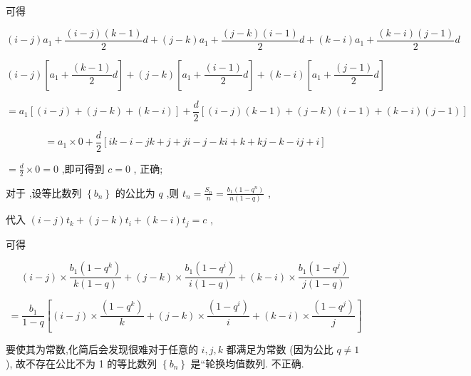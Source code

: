 \documentclass[10pt]{article}
\newcommand*\circled[1]{\tikz[baseline=(char.base)]{\node[shape=circle,draw,inner sep=1.5pt] (char) {\small #1};}}
\begin{document}
可得

\[
\left( {i - j}\right) {a}_{1} + \frac{\left( {i - j}\right) \left( {k - 1}\right) }{2}d + \left( {j - k}\right) {a}_{1} + \frac{\left( {j - k}\right) \left( {i - 1}\right) }{2}d + \left( {k - i}\right) {a}_{1} + \frac{\left( {k - i}\right) \left( {j - 1}\right) }{2}d
\]

\[
\left( {i - j}\right) \left\lbrack  {{a}_{1} + \frac{\left( k - 1\right) }{2}d}\right\rbrack   + \left( {j - k}\right) \left\lbrack  {{a}_{1} + \frac{\left( i - 1\right) }{2}d}\right\rbrack   + \left( {k - i}\right) \left\lbrack  {{a}_{1} + \frac{\left( j - 1\right) }{2}d}\right\rbrack
\]

\[
= {a}_{1}\left\lbrack  {\left( {i - j}\right)  + \left( {j - k}\right)  + \left( {k - i}\right) }\right\rbrack   + \frac{d}{2}\left\lbrack  {\left( {i - j}\right) \left( {k - 1}\right)  + \left( {j - k}\right) \left( {i - 1}\right)  + \left( {k - i}\right) \left( {j - 1}\right) }\right\rbrack
\]

\[
= {a}_{1} \times  0 + \frac{d}{2}\left\lbrack  {{ik} - i - {jk} + j + {ji} - j - {ki} + k + {kj} - k - {ij} + i}\right\rbrack
\]

\(= \frac{d}{2} \times  0 = 0\) ,即可得到 \(c = 0\) , \circled{1} 正确;

对于 \circled{2} ,设等比数列 \(\left\{  {b}_{n}\right\}\) 的公比为 \(q\) ,则 \({t}_{n} = \frac{{S}_{n}}{n} = \frac{{b}_{1}\left( {1 - {q}^{n}}\right) }{n\left( {1 - q}\right) }\) ,

代入 \(\left( {i - j}\right) {t}_{k} + \left( {j - k}\right) {t}_{i} + \left( {k - i}\right) {t}_{j} = c\) ,

可得

\[
\left( {i - j}\right)  \times  \frac{{b}_{1}\left( {1 - {q}^{k}}\right) }{k\left( {1 - q}\right) } + \left( {j - k}\right)  \times  \frac{{b}_{1}\left( {1 - {q}^{i}}\right) }{i\left( {1 - q}\right) } + \left( {k - i}\right)  \times  \frac{{b}_{1}\left( {1 - {q}^{j}}\right) }{j\left( {1 - q}\right) }
\]

\[
= \frac{{b}_{1}}{1 - q}\left\lbrack  {\left( {i - j}\right)  \times  \frac{\left( 1 - {q}^{k}\right) }{k} + \left( {j - k}\right)  \times  \frac{\left( 1 - {q}^{i}\right) }{i} + \left( {k - i}\right)  \times  \frac{\left( 1 - {q}^{j}\right) }{j}}\right\rbrack
\]

要使其为常数,化简后会发现很难对于任意的 \(i,j,k\) 都满足为常数 (因为公比 \(q \neq  1\) ), 故不存在公比不为 1 的等比数列 \(\left\{  {b}_{n}\right\}\) 是“轮换均值数列.  \circled{2} 不正确.
\end{document}
